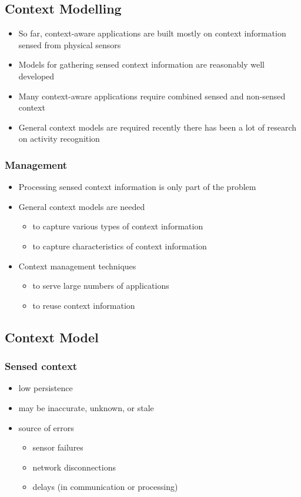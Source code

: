\subsection{Context Modelling}
\begin{itemize}
	\item So far, context-aware applications are built mostly on context information sensed from physical sensors
	\item Models for gathering sensed context information are reasonably well developed
	\item Many context-aware applications require combined sensed and non-sensed context
	\item General context models are required
	\subitem recently there has been a lot of research on activity recognition	
\end{itemize}

\subsubsection{Management}
\begin{itemize}
	\item Processing sensed context information is only part of the problem
	\item General context models are needed	
	\begin{itemize}
		\item to capture various types of context information
		\item to capture characteristics of context information
	\end{itemize}
	\item Context management techniques
	\begin{itemize}
		\item to serve large numbers of applications
		\item to reuse context information
	\end{itemize}
\end{itemize}

\subsection{Context Model}
\subsubsection{Sensed context}
\begin{itemize}
	\item low persistence
	\item may be inaccurate, unknown, or stale
	\item source of errors
	\begin{itemize}
		\item sensor failures
		\item network disconnections
		\item delays (in communication or processing)
	\end{itemize}	
\end{itemize}

